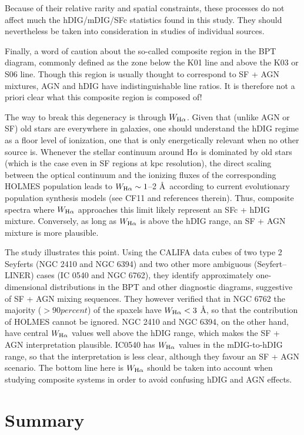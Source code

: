 \documentclass[a4paper, fleqn, usenatbib, useAMS]{mnras}
\newcommand{\Ha}{\ifmmode {\rm H}\alpha \else H$\alpha$\fi\xspace}
\begin{document}
Because of their relative rarity and spatial constraints, these processes do not affect much the hDIG/mDIG/SFc statistics found in this study. They should nevertheless be taken into consideration in studies of individual sources.

Finally, a word of caution about the so-called composite region in the BPT diagram, commonly defined as the zone below the K01 line and above the K03 or S06 line. Though this region is usually thought to correspond to SF + AGN mixtures, AGN and hDIG have indistinguishable line ratios. It is therefore not a priori clear what this composite region is composed of!

The way to break this degeneracy is through $W_{\Ha}$. Given that (unlike AGN or SF) old stars are everywhere in galaxies, one should understand the hDIG regime as a floor level of ionization, one that is only energetically relevant  when no other source is. Whenever the stellar continuum around \Ha is dominated by old stars (which is  the case even in SF regions at  kpc resolution), the direct scaling between the optical continuum and the ionizing fluxes of the corresponding HOLMES population leads to $W_{\Ha} \sim 1$--2 \AA\ according to current evolutionary population synthesis models (see CF11 and references therein). Thus, composite spectra where $W_{\Ha}$ approaches this limit likely represent an SFc + hDIG mixture. Conversely, as long as $W_{\Ha}$ is above the hDIG range, an SF + AGN mixture is more plausible.

The \citet{Davies.etal.2014} study illustrates this point. Using the CALIFA data cubes of two type 2 Seyferts (NGC 2410 and NGC 6394) and two other more ambiguous (Seyfert--LINER) cases (IC 0540 and NGC 6762), they identify approximately one-dimensional distributions in the BPT and other diagnostic diagrams, suggestive of SF + AGN mixing sequences. They however verified that in NGC 6762 the majority ($> 90 per cent$) of the spaxels have $W_{\Ha} < 3$ \AA, so that the contribution of HOLMES cannot be ignored. NGC 2410 and NGC 6394, on the other hand, have central $W_{\Ha}$ values well above the hDIG range, which makes the SF + AGN interpretation plausible. IC0540 has $W_{\Ha}$ values in the mDIG-to-hDIG range, so that the interpretation is less clear, although they favour an SF + AGN scenario. The bottom line here is $W_{\Ha}$ should be taken into account when studying composite systems in order to avoid confusing hDIG and AGN effects.

\section{Summary}
\label{sec:Conclusions}
\end{document}
